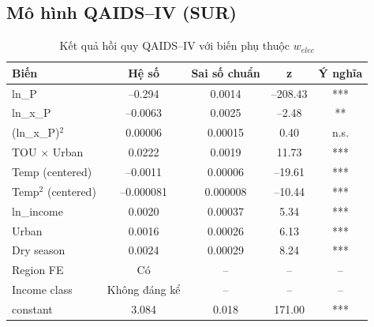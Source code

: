 \documentclass[12pt,a4paper,oneside]{article}
\begin{document}
\subsection{Mô hình QAIDS–IV (SUR)}
\begin{table}[H]
	\centering
	\caption{Kết quả hồi quy QAIDS–IV với biến phụ thuộc $w_{elec}$}
	\begin{tabular}{l c c c c}
		\toprule
		Biến & Hệ số & Sai số chuẩn & z & Ý nghĩa \\
		\midrule
		ln\_P & –0.294 & 0.0014 & –208.43 & *** \\
		ln\_x\_P & –0.0063 & 0.0025 & –2.48 & ** \\
		(ln\_x\_P)$^2$ & 0.00006 & 0.00015 & 0.40 & n.s. \\
		TOU $\times$ Urban & 0.0222 & 0.0019 & 11.73 & *** \\
		Temp (centered) & –0.0011 & 0.00006 & –19.61 & *** \\
		Temp$^2$ (centered) & –0.000081 & 0.000008 & –10.44 & *** \\
		ln\_income & 0.0020 & 0.00037 & 5.34 & *** \\
		Urban & 0.0016 & 0.00026 & 6.13 & *** \\
		Dry season & 0.0024 & 0.00029 & 8.24 & *** \\
		Region FE & Có & – & – & – \\
		Income class & Không đáng kể & – & – & – \\
		constant & 3.084 & 0.018 & 171.00 & *** \\
		\bottomrule
	\end{tabular}
\end{table}
\end{document}
